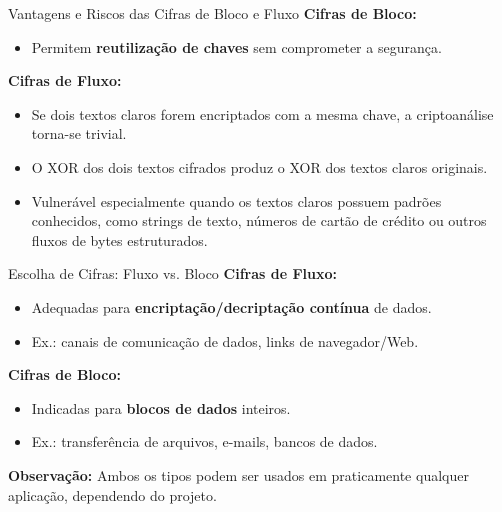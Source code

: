 \begin{frame}{Vantagens e Riscos das Cifras de Bloco e Fluxo}
    \textbf{Cifras de Bloco:}
    \begin{itemize}
        \item Permitem \textbf{reutilização de chaves} sem comprometer a segurança.
    \end{itemize}

    \textbf{Cifras de Fluxo:}
    \begin{itemize}
        \item Se dois textos claros forem encriptados com a mesma chave, a criptoanálise torna-se trivial.
        \item O XOR dos dois textos cifrados produz o XOR dos textos claros originais.
        \item Vulnerável especialmente quando os textos claros possuem padrões conhecidos, como strings de texto, números de cartão de crédito ou outros fluxos de bytes estruturados.
    \end{itemize}
\end{frame}

\begin{frame}{Escolha de Cifras: Fluxo vs. Bloco}
    \textbf{Cifras de Fluxo:}
    \begin{itemize}
        \item Adequadas para \textbf{encriptação/decriptação contínua} de dados.
        \item Ex.: canais de comunicação de dados, links de navegador/Web.
    \end{itemize}

    \textbf{Cifras de Bloco:}
    \begin{itemize}
        \item Indicadas para \textbf{blocos de dados} inteiros.
        \item Ex.: transferência de arquivos, e-mails, bancos de dados.
    \end{itemize}

    \textbf{Observação:} Ambos os tipos podem ser usados em praticamente qualquer aplicação, dependendo do projeto.
\end{frame}

